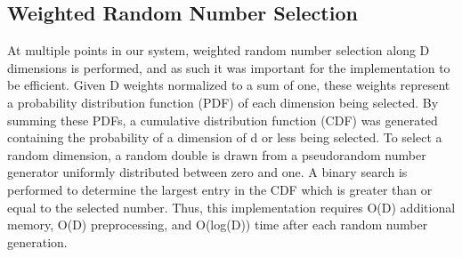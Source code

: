 \subsection{Weighted Random Number Selection}
\label{sec:rng}

At multiple points in our system, weighted random number selection along D dimensions is performed, and as such it was important for the implementation to be efficient.  Given D weights normalized to a sum of one, these weights represent a probability distribution function (PDF) of each dimension being selected.  By summing these PDFs, a cumulative distribution function (CDF) was generated containing the probability of a dimension of d or less being selected.  To select a random dimension, a random double is drawn from a pseudorandom number generator uniformly distributed between zero and one.  A binary search is performed to determine the largest entry in the CDF which is greater than or equal to the selected number.  Thus, this implementation requires O(D) additional memory, O(D) preprocessing, and O(log(D)) time after each random number generation.